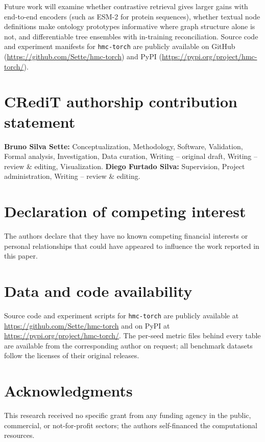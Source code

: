 \documentclass[preprint,12pt]{elsarticle}
\begin{document}
Future work will examine whether contrastive retrieval gives larger gains
with end-to-end encoders (such as ESM-2 for protein sequences), whether
textual node definitions make ontology prototypes informative where graph
structure alone is not, and differentiable tree ensembles with in-training
reconciliation.
Source code and experiment manifests for \texttt{hmc-torch} are publicly
available on GitHub (\url{https://github.com/Sette/hmc-torch}) and PyPI
(\url{https://pypi.org/project/hmc-torch/}).



\section*{CRediT authorship contribution statement}
\textbf{Bruno Silva Sette:} Conceptualization, Methodology, Software, Validation,
Formal analysis, Investigation, Data curation, Writing -- original draft,
Writing -- review \& editing, Visualization.
\textbf{Diego Furtado Silva:} Supervision, Project administration,
Writing -- review \& editing.

\section*{Declaration of competing interest}
The authors declare that they have no known competing financial interests or
personal relationships that could have appeared to influence the work reported
in this paper.

\section*{Data and code availability}
Source code and experiment scripts for \texttt{hmc-torch} are publicly
available at \url{https://github.com/Sette/hmc-torch} and on PyPI at
\url{https://pypi.org/project/hmc-torch/}. The per-seed metric files behind
every table are available from the corresponding author on request; all
benchmark datasets follow the
licenses of their original releases.

\section*{Acknowledgments}
This research received no specific grant from any funding agency in the public,
commercial, or not-for-profit sectors; the authors self-financed the
computational resources.
\end{document}
